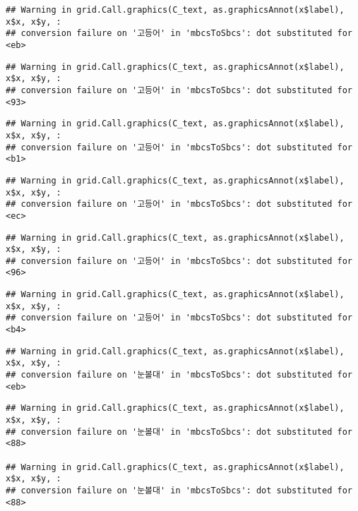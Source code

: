 \documentclass[
]{article}
\begin{document}
\begin{verbatim}
## Warning in grid.Call.graphics(C_text, as.graphicsAnnot(x$label), x$x, x$y, :
## conversion failure on '고등어' in 'mbcsToSbcs': dot substituted for <eb>
\end{verbatim}

\begin{verbatim}
## Warning in grid.Call.graphics(C_text, as.graphicsAnnot(x$label), x$x, x$y, :
## conversion failure on '고등어' in 'mbcsToSbcs': dot substituted for <93>
\end{verbatim}

\begin{verbatim}
## Warning in grid.Call.graphics(C_text, as.graphicsAnnot(x$label), x$x, x$y, :
## conversion failure on '고등어' in 'mbcsToSbcs': dot substituted for <b1>
\end{verbatim}

\begin{verbatim}
## Warning in grid.Call.graphics(C_text, as.graphicsAnnot(x$label), x$x, x$y, :
## conversion failure on '고등어' in 'mbcsToSbcs': dot substituted for <ec>
\end{verbatim}

\begin{verbatim}
## Warning in grid.Call.graphics(C_text, as.graphicsAnnot(x$label), x$x, x$y, :
## conversion failure on '고등어' in 'mbcsToSbcs': dot substituted for <96>
\end{verbatim}

\begin{verbatim}
## Warning in grid.Call.graphics(C_text, as.graphicsAnnot(x$label), x$x, x$y, :
## conversion failure on '고등어' in 'mbcsToSbcs': dot substituted for <b4>
\end{verbatim}

\begin{verbatim}
## Warning in grid.Call.graphics(C_text, as.graphicsAnnot(x$label), x$x, x$y, :
## conversion failure on '눈볼대' in 'mbcsToSbcs': dot substituted for <eb>
\end{verbatim}

\begin{verbatim}
## Warning in grid.Call.graphics(C_text, as.graphicsAnnot(x$label), x$x, x$y, :
## conversion failure on '눈볼대' in 'mbcsToSbcs': dot substituted for <88>

## Warning in grid.Call.graphics(C_text, as.graphicsAnnot(x$label), x$x, x$y, :
## conversion failure on '눈볼대' in 'mbcsToSbcs': dot substituted for <88>
\end{verbatim}
\end{document}
